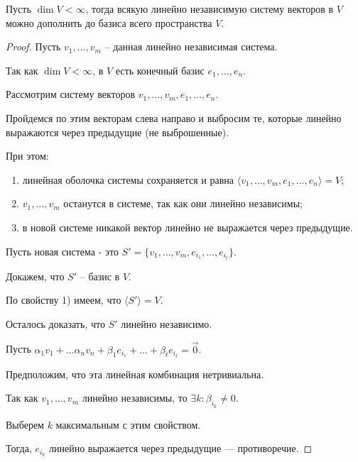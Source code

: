 \documentclass[a4paper]{article}
\begin{document}
\begin{colloq}
            \begin{proposal}
                Пусть $\dim V < \infty$, тогда всякую линейно независимую систему векторов в $V$ можно дополнить до базиса всего пространства $V$.
            \end{proposal}

            \begin{proof}
                Пусть $v_1, \dots, v_m$ -- данная линейно независимая система.

                Так как $\dim V < \infty$, в $V$ есть конечный базис $e_1, \dots, e_n$.

                Рассмотрим систему векторов $v_1, \dots, v_m, e_1, \dots, e_n$.

                Пройдемся по этим векторам слева направо и выбросим те, которые линейно выражаются через предыдущие (не выброшенные).

                При этом:
                \begin{enumerate}[nosep, label=\arabic*)]
                \item линейная оболочка системы сохраняется и равна $\langle v_1, \dots, v_m, e_1, \dots, e_n \rangle = V$;
                \item $v_1, \dots, v_m$ останутся в системе, так как они линейно независимы;
                \item в новой системе никакой вектор линейно не выражается через предыдущие.
                \end{enumerate}

                Пусть новая система - это $S' = \{v_1, \dots, v_m, e_{i_1}, \dots, e_{i_t}\}$.

                Докажем, что $S'$ -- базис в $V$.

                По свойству 1) имеем, что $\langle S' \rangle = V$.

                Осталось доказать, что $S'$ линейно независимо.

                Пусть $\alpha_1 v_1 + \dots \alpha_n v_n + \beta_1 e_{i_1} + \dots + \beta_t e_{i_t} = \overrightarrow{0}$.

                Предположим, что эта линейная комбинация нетривиальна.

                Так как $v_1, \dots, v_m$ линейно независимы, то $\exists k : \beta_{i_k} \neq 0$.

                Выберем $k$ максимальным с этим свойством.

                Тогда, $e_{i_k}$ линейно выражается через предыдущие --- противоречие.
            \end{proof}


\end{colloq}
\end{document}
